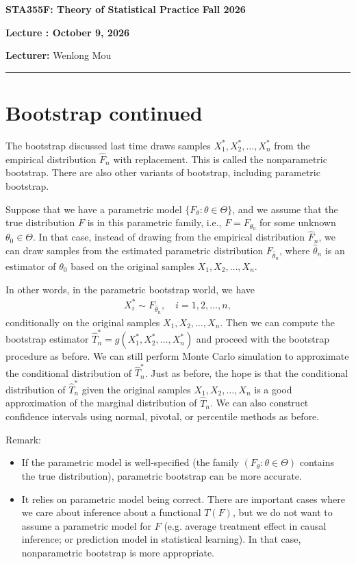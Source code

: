 \documentclass[11pt,letterpaper]{article}
\newcommand{\coursenumber}{STA355F}
\newcommand{\coursetitle}{Theory of Statistical Practice}
\newcommand{\courseterm}{Fall 2026}
\newcounter{lecture}
\newcommand{\lecturenumber}{\arabic{lecture}}
\newcommand{\lecturedate}{October 9, 2026}
\newcommand{\lecturer}{Wenlong Mou}
\numberwithin{assumption}{lecture}
\numberwithin{theorem}{lecture}
\numberwithin{proposition}{lecture}
\numberwithin{lemma}{lecture}
\numberwithin{claim}{lecture}
\numberwithin{corollary}{lecture}
\numberwithin{definition}{lecture}
\numberwithin{conjecture}{lecture}
\numberwithin{remark}{lecture}
\numberwithin{example}{lecture}
\numberwithin{equation}{lecture}
\newcommand{\makelecturenotesheader}{%
  \noindent
  \textbf{\coursenumber: \coursetitle}%
  \hfill
  \textbf{\courseterm}

  \begin{center}
    {\Large\bfseries Lecture \lecturenumber: \lecturedate}
  \end{center}

  \noindent
  \textbf{Lecturer:} \lecturer
  \par\medskip
  \hrule
  \bigskip
}
\begin{document}
\makelecturenotesheader

\section{Bootstrap continued}
The bootstrap discussed last time draws samples $X_1^*, X_2^*, \ldots, X_n^*$ from the empirical distribution $\widehat{F}_n$ with replacement. This is called the nonparametric bootstrap. There are also other variants of bootstrap, including parametric bootstrap.

Suppose that we have a parametric model $\{F_\theta: \theta \in \Theta\}$, and we assume that the true distribution $F$ is in this parametric family, i.e., $F = F_{\theta_0}$ for some unknown $\theta_0 \in \Theta$. In that case, instead of drawing from the empirical distribution $\widehat{F}_n$, we can draw samples from the estimated parametric distribution $F_{\widehat{\theta}_n}$, where $\widehat{\theta}_n$ is an estimator of $\theta_0$ based on the original samples $X_1, X_2, \ldots, X_n$.

In other words, in the parametric bootstrap world, we have
\begin{align*}
  X_i^* \sim F_{\widehat{\theta}_n}, \quad i = 1, 2, \ldots, n,
\end{align*}
conditionally on the original samples $X_1, X_2, \ldots, X_n$. Then we can compute the bootstrap estimator $\widehat{T}_n^* = g(X_1^*, X_2^*, \ldots, X_n^*)$ and proceed with the bootstrap procedure as before. We can still perform Monte Carlo simulation to approximate the conditional distribution of $\widehat{T}_n^*$. Just as before, the hope is that the conditional distribution of $\widehat{T}_n^*$ given the original samples $X_1, X_2, \ldots, X_n$ is a good approximation of the marginal distribution of $\widehat{T}_n$. We can also construct confidence intervals using normal, pivotal, or percentile methods as before.

\bigskip
Remark:
\begin{itemize}
  \item If the parametric model is well-specified (the family $(F_\theta : \theta \in \Theta)$ contains the true distribution), parametric bootstrap can be more accurate.
  \item It relies on parametric model being correct. There are important cases where we care about inference about a functional $T(F)$, but we do not want to assume a parametric model for $F$ (e.g. average treatment effect in causal inference; or prediction model in statistical learning). In that case, nonparametric bootstrap is more appropriate.
\end{itemize}
\end{document}
